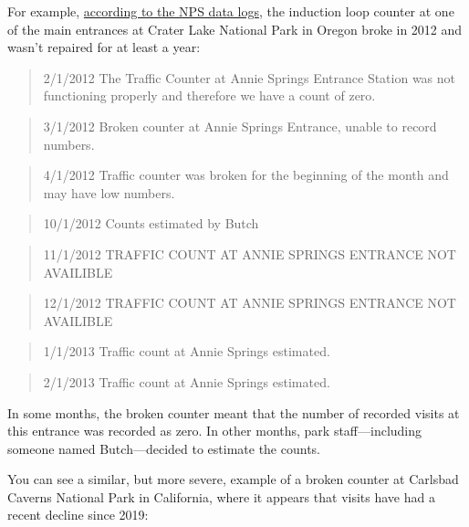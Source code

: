 \documentclass[
  letterpaper,
  DIV=11,
  numbers=noendperiod]{scrartcl}
\begin{document}
For example,
\href{https://irma.nps.gov/Stats/SSRSReports/Park\%20Specific\%20Reports/Monthly\%20Visitation\%20Comments\%20By\%20Park?Park=CRLA}{according
to the NPS data logs}, the induction loop counter at one of the main
entrances at Crater Lake National Park in Oregon broke in 2012 and
wasn't repaired for at least a year:

\begin{quote}
2/1/2012 \textbar{} The Traffic Counter at Annie Springs Entrance
Station was not functioning properly and therefore we have a count of
zero.
\end{quote}

\begin{quote}
3/1/2012 \textbar{} Broken counter at Annie Springs Entrance, unable to
record numbers.
\end{quote}

\begin{quote}
4/1/2012 \textbar{} Traffic counter was broken for the beginning of the
month and may have low numbers.
\end{quote}

\begin{quote}
10/1/2012 \textbar{} Counts estimated by Butch
\end{quote}

\begin{quote}
11/1/2012 \textbar{} TRAFFIC COUNT AT ANNIE SPRINGS ENTRANCE NOT
AVAILIBLE
\end{quote}

\begin{quote}
12/1/2012 \textbar{} TRAFFIC COUNT AT ANNIE SPRINGS ENTRANCE NOT
AVAILIBLE
\end{quote}

\begin{quote}
1/1/2013 \textbar{} Traffic count at Annie Springs estimated.
\end{quote}

\begin{quote}
2/1/2013 \textbar{} Traffic count at Annie Springs estimated.
\end{quote}

In some months, the broken counter meant that the number of recorded
visits at this entrance was recorded as zero. In other months, park
staff---including someone named Butch---decided to estimate the counts.

You can see a similar, but more severe, example of a broken counter at
Carlsbad Caverns National Park in California, where it appears that
visits have had a recent decline since 2019:
\end{document}
